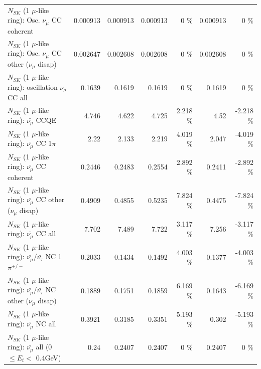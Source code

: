 \begin{table}
\begin{tabular}{| l | r | r | r  r | r  r |}
                        $N_{SK}$ (1 $\mu$-like ring): Osc. $\nu_\mu$ CC coherent &        0.000913 &        0.000913 &        0.000913 &        0 \%  &        0.000913 &        0 \%  \\ 
         $N_{SK}$ (1 $\mu$-like ring): Osc. $\nu_\mu$ CC other ($\nu_\mu$ disap) &        0.002647 &        0.002608 &        0.002608 &        0 \%  &        0.002608 &        0 \%  \\ 
                      $N_{SK}$ (1 $\mu$-like ring): oscillation $\nu_\mu$ CC all &          0.1639 &          0.1619 &          0.1619 &        0 \%  &          0.1619 &        0 \%  \\ 
\hline
\hline
                              $N_{SK}$ (1 $\mu$-like ring): $\bar{\nu_\mu}$ CCQE &           4.746 &           4.622 &           4.725 &    2.218 \%  &            4.52 &   -2.218 \%  \\ 
                         $N_{SK}$ (1 $\mu$-like ring): $\bar{\nu_\mu}$ CC 1$\pi$ &            2.22 &           2.133 &           2.219 &    4.019 \%  &           2.047 &   -4.019 \%  \\ 
                       $N_{SK}$ (1 $\mu$-like ring): $\bar{\nu_\mu}$ CC coherent &          0.2446 &          0.2483 &          0.2554 &    2.892 \%  &          0.2411 &   -2.892 \%  \\ 
        $N_{SK}$ (1 $\mu$-like ring): $\bar{\nu_\mu}$ CC other ($\nu_\mu$ disap) &          0.4909 &          0.4855 &          0.5235 &    7.824 \%  &          0.4475 &   -7.824 \%  \\ 
                          $N_{SK}$ (1 $\mu$-like ring): $\bar{\nu_{\mu}}$ CC all &           7.702 &           7.489 &           7.722 &    3.117 \%  &           7.256 &   -3.117 \%  \\ 
\hline
  $N_{SK}$ (1 $\mu$-like ring): $\bar{\nu_\mu}$/$\bar{\nu_\tau}$ NC 1$\pi^{+/-}$ &          0.2033 &          0.1434 &          0.1492 &    4.003 \%  &          0.1377 &   -4.003 \%  \\ 
$N_{SK}$ (1 $\mu$-like ring): $\bar{\nu_\mu}$/$\bar{\nu_\tau}$ NC other ($\nu_\mu$ disap) &          0.1889 &          0.1751 &          0.1859 &    6.169 \%  &          0.1643 &   -6.169 \%  \\ 
                          $N_{SK}$ (1 $\mu$-like ring): $\bar{\nu_{\mu}}$ NC all &          0.3921 &          0.3185 &          0.3351 &    5.193 \%  &           0.302 &   -5.193 \%  \\ 
\hline
   $N_{SK}$ (1 $\mu$-like ring): $\bar{\nu_{\mu}}$ all (0 $\leq E_{t} <$ 0.4GeV) &            0.24 &          0.2407 &          0.2407 &        0 \%  &          0.2407 &        0 \%  \\ 

\end{tabular}
\end{table}
